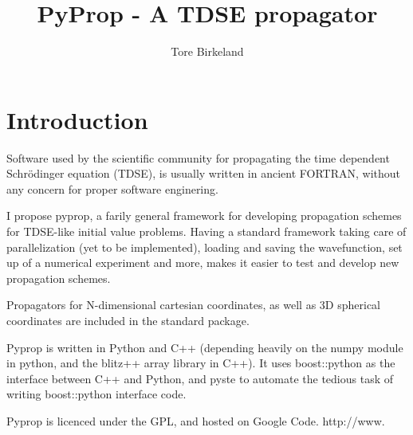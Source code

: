 \documentclass[a4paper,12pt]{report}
\title{PyProp - A TDSE propagator}
\author{Tore Birkeland}
\begin{document}
\maketitle

\chapter{Introduction}
Software used by the scientific community for propagating the time dependent Schrödinger equation (TDSE), 
is usually written in ancient FORTRAN, without any concern for proper software enginering.

I propose pyprop, a farily general framework for developing propagation schemes for TDSE-like 
initial value problems. Having a standard framework taking care of parallelization (yet to be implemented), 
loading and saving the wavefunction, set up of a numerical experiment and more, makes it easier to test 
and develop new propagation schemes. 

Propagators for N-dimensional cartesian coordinates, as well as 3D spherical coordinates are included 
in the standard package.

Pyprop is written in Python and C++ (depending heavily on the numpy module in python, and the
blitz++ array library in C++). It uses boost::python as the interface between C++ and Python, 
and pyste to automate the tedious task of writing boost::python interface code.

Pyprop is licenced under the GPL, and hosted on Google Code. http://www.






\end{document}
